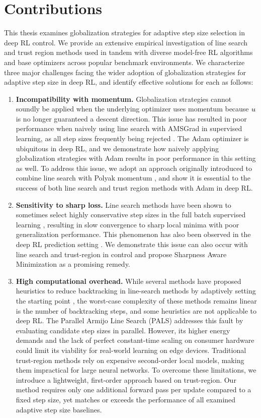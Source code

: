   \section{Contributions}
  This thesis examines globalization strategies for adaptive step size selection in deep RL control. We provide an extensive empirical investigation of line search and trust region methods used in tandem with diverse model-free RL algorithms and base optimizers across popular benchmark environments. We characterize three major challenges facing the wider adoption of globalization strategies for adaptive step size in deep RL, and identify effective solutions for each as follows:
  
  \begin{enumerate}
  \item \textbf{Incompatibility with momentum.} Globalization strategies cannot soundly be applied when the underlying optimizer uses momentum because $u$ is no longer guaranteed a descent direction. This issue has resulted in poor performance when naively using line search with AMSGrad  in supervised learning, as all step sizes frequently being rejected . The Adam optimizer \cite{kingma2015adam} is ubiquitous in deep RL, and we demonstrate how naively applying globalization strategies with Adam results in poor performance in this setting as well. To address this issue, we adopt an approach originally introduced to combine line search with Polyak momentum \cite{vaswani2020adaptive}, and show it is essential to the success of both line search and trust region methods with Adam in deep RL.
  \item \textbf{Sensitivity to sharp loss.} Line search methods have been shown to sometimes select highly conservative step sizes in the full batch supervised learning , resulting in slow convergence to sharp local minima with poor generalization performance. This phenomenon has also been observed in the deep RL prediction setting \cite{PALS2026}. We demonstrate this issue can also occur with line search and trust-region in control and propose Sharpness Aware Minimization  as a promising remedy. 
  \item \textbf{High computational overhead.} While several methods have proposed heuristics to reduce backtracking in line-search methods by adaptively setting the starting point \cite{vaswani2019painless}, the worst-case complexity of these methods remains linear is the number of backtracking steps, and some heuristics are not applicable to deep RL. The Parallel Armijo Line Search (PALS) \cite{PALS2026} addresses this fault by evaluating candidate step sizes in parallel. However, its higher energy demands and the lack of perfect constant-time scaling on consumer hardware could limit its viability for real-world learning on edge devices. Traditional trust-region methods rely on expensive second-order local models, making them impractical for large neural networks. To overcome these limitations, we introduce a lightweight, first-order approach based on trust-region. Our method requires only one additional forward pass per update compared to a fixed step size, yet matches or exceeds the performance of all examined adaptive step size baselines.

\end{enumerate}
